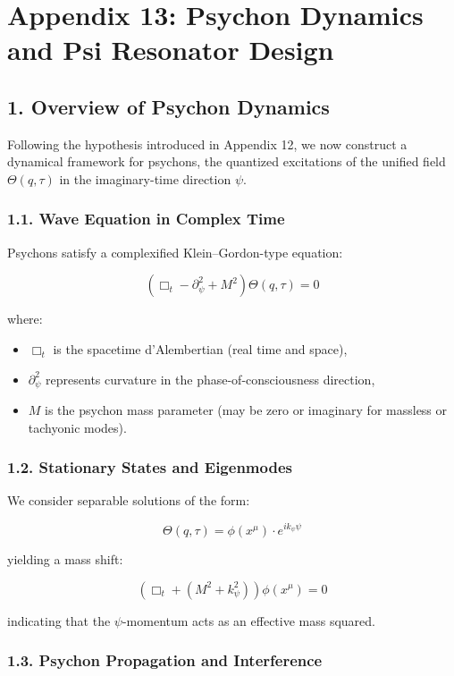 
\section*{Appendix 13: Psychon Dynamics and Psi Resonator Design}

\subsection*{1. Overview of Psychon Dynamics}

Following the hypothesis introduced in Appendix 12, we now construct a dynamical framework for psychons, 
the quantized excitations of the unified field \(\Theta(q, \tau)\) in the imaginary-time direction \(\psi\).

\subsubsection*{1.1. Wave Equation in Complex Time}

Psychons satisfy a complexified Klein–Gordon-type equation:

\[
\left( \Box_t - \partial_\psi^2 + M^2 \right) \Theta(q, \tau) = 0
\]

where:
\begin{itemize}
  \item \(\Box_t\) is the spacetime d'Alembertian (real time and space),
  \item \(\partial_\psi^2\) represents curvature in the phase-of-consciousness direction,
  \item \(M\) is the psychon mass parameter (may be zero or imaginary for massless or tachyonic modes).
\end{itemize}

\subsubsection*{1.2. Stationary States and Eigenmodes}

We consider separable solutions of the form:

\[
\Theta(q, \tau) = \phi(x^\mu) \cdot e^{i k_\psi \psi}
\]

yielding a mass shift:

\[
\left( \Box_t + (M^2 + k_\psi^2) \right) \phi(x^\mu) = 0
\]

indicating that the \(\psi\)-momentum acts as an effective mass squared.

\subsubsection*{1.3. Psychon Propagation and Interference}

